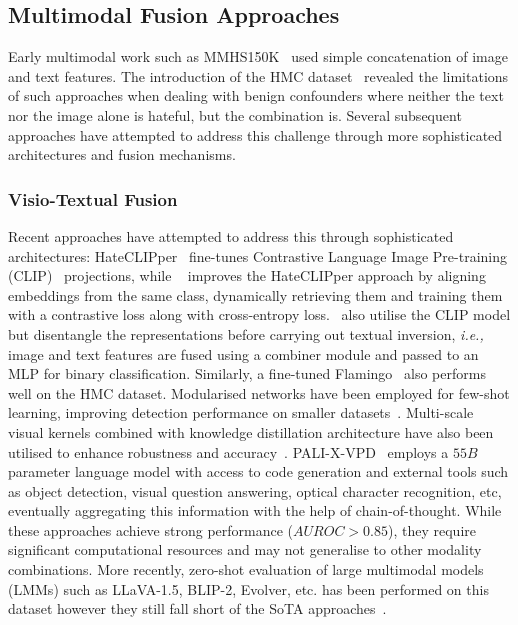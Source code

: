 \subsection{Multimodal Fusion Approaches}
Early multimodal work such as MMHS150K~\citep{gomez2020exploring} used simple concatenation of image and text features. The introduction of the HMC dataset~\citep{kiela2020hateful} revealed the limitations of such approaches when dealing with benign confounders where neither the text nor the image alone is hateful, but the combination is. Several subsequent approaches have attempted to address this challenge through more sophisticated architectures and fusion mechanisms.

\subsubsection{Visio-Textual Fusion}
Recent approaches have attempted to address this through sophisticated architectures: HateCLIPper~\citep{kumar2022hate} fine-tunes Contrastive Language Image Pre-training (CLIP)~\citep{radford2021learning} projections, while ~\citet{mei2023improving} improves the HateCLIPper approach by aligning embeddings from the same class, dynamically retrieving them and training them with a contrastive loss along with cross-entropy loss.~\citet{burbi2023mapping} also utilise the CLIP model but disentangle the representations before carrying out textual inversion, \textit{i.e.,} image and text features are fused using a combiner module and passed to an MLP for binary classification. Similarly, a fine-tuned Flamingo~\citep{alayrac2022flamingo} also performs well on the HMC dataset. Modularised networks have been employed for few-shot learning, improving detection performance on smaller datasets~\citep{cao2024modularized}. Multi-scale visual kernels combined with knowledge distillation architecture have also been utilised to enhance robustness and accuracy~\citep{chhabra2023multimodal}. PALI-X-VPD~\citep{hu2023visual} employs a $55B$ parameter language model with access to code generation and external tools such as object detection, visual question answering, optical character recognition, etc, eventually aggregating this information with the help of chain-of-thought. While these approaches achieve strong performance ($AUROC > 0.85$), they require significant computational resources and may not generalise to other modality combinations. More recently, zero-shot evaluation of large multimodal models (LMMs) such as LLaVA-1.5, BLIP-2, Evolver, etc. has been performed on this dataset however they still fall short of the SoTA approaches~\citep{huang2024evolver}.

